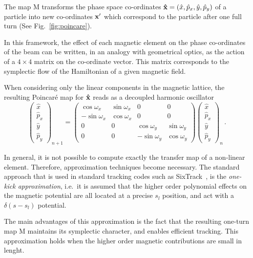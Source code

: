 The map \(\mathrm{M}\) transforms the phase space co-ordinates \(\vb{\hat x} = (\hat x, \hat p_x, \hat y, \hat p_y)\) of a particle into new co-ordinates \(\vb{x}'\) which correspond to the particle after one full turn (See Fig.~\ref{fig:poincare}).

In this framework, the effect of each magnetic element on the phase co-ordinates of the beam can be written, in an analogy with geometrical optics, as the action of a $4\times4$ matrix on the co-ordinate vector. This matrix corresponds to the symplectic flow of the Hamiltonian of a given magnetic field.

When considering only the linear components in the magnetic lattice, the resulting Poincaré map for $\vb{\hat x}$ reads as a decoupled harmonic oscillator
%
\begin{equation} 
	\begin{pmatrix}
		\hat x \\ \hat p_x \\ \hat y \\ \hat p_y 
	\end{pmatrix}_{n+1}
	=
	\begin{pmatrix}
		\cos\omega_x & \sin\omega_x & 0 & 0 \\
		-\sin\omega_x & \cos\omega_x & 0 & 0 \\
		0 & 0 &\cos\omega_y & \sin\omega_y \\
		0 & 0 &-\sin\omega_y & \cos\omega_y
	\end{pmatrix}
	\begin{pmatrix}
		\hat x \\ \hat p_x \\ \hat y \\ \hat p_y 
	\end{pmatrix}_{n}\,.
\end{equation}

In general, it is not possible to compute exactly the transfer map of a non-linear element. Therefore, approximation techniques become necessary. The standard approach that is used in standard tracking codes such as SixTrack~\cite{sixtrack}, is the \textit{one-kick approximation}, i.e.\ it is assumed that the higher order polynomial effects on the magnetic potential are all located at a precise $s_l$ position, and act with a $\delta(s - s_l)$ potential.

The main advantages of this approximation is the fact that the resulting one-turn map $\mathrm{M}$ maintains its symplectic character, and enables efficient tracking. This approximation holds when the higher order magnetic contributions are small in lenght.

